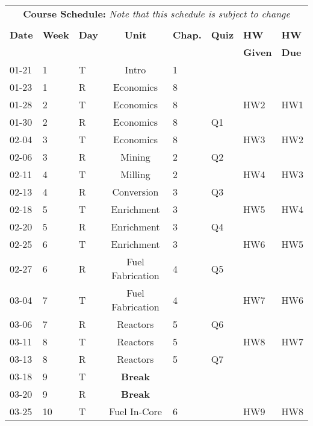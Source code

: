 \documentclass[11pt, a4paper]{article}
\begin{document}
\pagebreak
\FloatBarrier
\renewcommand{\arraystretch}{1}
\begin{table}[h]
\begin{center}
\begin{tabular}{lllcllll}
\multicolumn{8}{c}{\textbf{Course Schedule:}\textit{ Note that this schedule is subject to change}}\\
&&&&&&&\\
\textbf{Date} & \textbf{Week} & \textbf{Day} & \textbf{Unit} & \textbf{Chap.} & \textbf{Quiz} & \textbf{HW} & \textbf{HW}\\
 &  &  &  &  &                                                                                          & \textbf{Given} & \textbf{Due}\\
\hline
\hline
01-21 & 1 & T & Intro      & 1 &           &      &    \\
01-23 & 1 & R & Economics  & 8 &           &      &    \\
01-28 & 2 & T & Economics  & 8 &           &  HW2 & HW1\\
01-30 & 2 & R & Economics  & 8 &        Q1 &      &    \\
02-04 & 3 & T & Economics  & 8 &           &  HW3 & HW2\\
02-06 & 3 & R & Mining     & 2 & Q2 &      &    \\
02-11 & 4 & T & Milling    & 2 &    &  HW4 & HW3\\
02-13 & 4 & R & Conversion & 3 & Q3 &      &    \\
02-18 & 5 & T & Enrichment & 3 &           &  HW5 & HW4\\
02-20 & 5 & R & Enrichment & 3 &        Q4 &      &    \\
02-25 & 6 & T & Enrichment & 3 &           &  HW6 & HW5\\
02-27 & 6 & R & Fuel Fabrication & 4 &  Q5 &      &    \\
03-04 & 7 & T & Fuel Fabrication & 4 &     &  HW7 & HW6\\
03-06 & 7 & R & Reactors & 5 &          Q6 &      &    \\
03-11 & 8 & T & Reactors & 5 &             &  HW8 & HW7\\
03-13 & 8 & R & Reactors & 5 &          Q7 &      &    \\
03-18 & 9 & T & \textbf{Break} &  &   &      &    \\
03-20 & 9 & R & \textbf{Break} &  &   &      &    \\
03-25 & 10 & T & Fuel In-Core & 6 &         &  HW9 & HW8 \\

\end{tabular}
\end{center}
\end{table}
\end{document}
